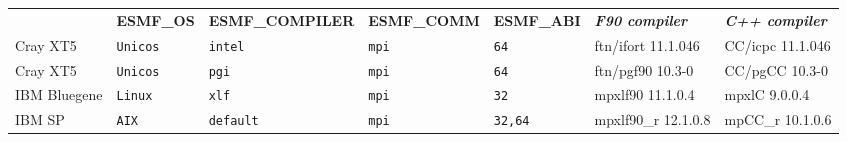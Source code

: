 \begin{tabular}{lllllll}
  &{\bfseries\footnotesize ESMF\_OS} &{\bfseries\footnotesize ESMF\_COMPILER} & {\bfseries\footnotesize ESMF\_COMM} & {\bfseries\footnotesize ESMF\_ABI} &
  {\bfseries\footnotesize\it F90 compiler} & {\bfseries\footnotesize\it C++ compiler} \\

Cray XT5              &\tt Unicos &\tt intel        &\tt mpi        &\tt 64              & ftn/ifort \footnotesize 11.1.046   & CC/icpc \footnotesize 11.1.046  \\ %
Cray XT5              &\tt Unicos &\tt pgi          &\tt mpi        &\tt 64              & ftn/pgf90 \footnotesize 10.3-0     & CC/pgCC \footnotesize 10.3-0    \\ %
IBM Bluegene          &\tt Linux  &\tt xlf          &\tt mpi        &\tt 32              & mpxlf90 \footnotesize 11.1.0.4     & mpxlC \footnotesize 9.0.0.4     \\ %
IBM SP                &\tt AIX    &\tt default      &\tt mpi        &\tt 32,64           & mpxlf90\_r \footnotesize 12.1.0.8  & mpCC\_r \footnotesize 10.1.0.6  \\ %

\end{tabular}
